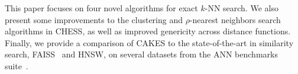 This paper focuses on four novel algorithms for exact $k$-NN search.
We also present some improvements to the clustering and $\rho$-nearest neighbors search algorithms in CHESS, as well as improved genericity across distance functions.
Finally, we provide a comparison of CAKES to the state-of-the-art in similarity search, FAISS~\cite{johnson2019billion} and HNSW, on several datasets from the ANN benchmarks suite~\cite{aumuller2020ann}.
